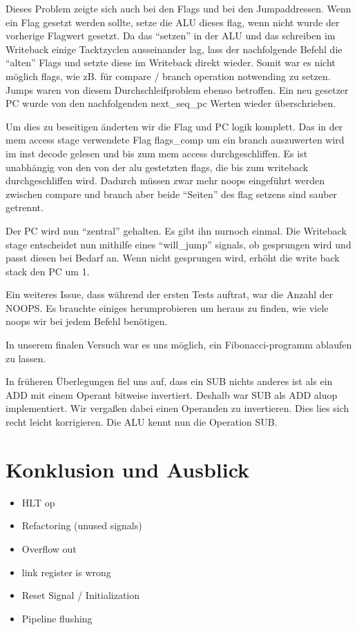 \documentclass[paper=a4,fontsize=12pt]{scrreprt}
\begin{document}
Dieses Problem zeigte sich auch bei den Flags und bei den Jumpaddressen.
Wenn ein Flag gesetzt werden sollte, setze die ALU dieses flag, wenn nicht wurde der vorherige Flagwert gesetzt.
Da das \enquote{setzen} in der ALU und das schreiben im Writeback einige Tacktzyclen ausseinander lag, lass der nachfolgende Befehl die \enquote{alten} Flags und setzte diese im Writeback direkt wieder.
Somit war es nicht möglich flags, wie zB. für compare / branch operation notwending zu setzen.
Jumps waren von diesem Durchschleifproblem ebenso betroffen. Ein neu gesetzer PC wurde von den nachfolgenden next\_seq\_pc Werten wieder überschrieben.

Um dies zu beseitigen änderten wir die Flag und PC logik komplett.
Das in der mem access stage verwendete Flag flags\_comp um ein branch auszuwerten wird im inst decode gelesen und bis zum mem access durchgeschliffen.
Es ist unabhängig von den von der alu gestetzten flags, die bis zum writeback durchgeschliffen wird.
Dadurch müssen zwar mehr noops eingeführt werden zwischen compare und branch aber beide \enquote{Seiten} des flag setzens sind sauber getrennt.

Der PC wird nun \enquote{zentral} gehalten.
Es gibt ihn nurnoch einmal.
Die Writeback stage entscheidet nun mithilfe eines \enquote{will\_jump} signals, ob gesprungen wird und passt diesen bei Bedarf an.
Wenn nicht gesprungen wird, erhöht die write back stack den PC um 1.

Ein weiteres Issue, dass während der ersten Tests auftrat, war die Anzahl der NOOPS.
Es brauchte einiges herumprobieren um heraus zu finden, wie viele noops wir bei jedem Befehl benötigen.

In unserem finalen Versuch war es uns möglich, ein Fibonacci-programm ablaufen zu lassen.

In früheren Überlegungen fiel uns auf, dass ein SUB nichts anderes ist als ein ADD mit einem Operant bitweise invertiert.
Deshalb war SUB als ADD aluop implementiert.
Wir vergaßen dabei einen Operanden zu invertieren.
Dies lies sich recht leicht korrigieren.
Die ALU kennt nun die Operation SUB.

\chapter{Konklusion und Ausblick}
\begin{itemize}
    \item HLT op
    \item Refactoring (unused signals)
    \item Overflow out
    \item link register is wrong
    \item Reset Signal / Initialization
    \item Pipeline flushing
\end{itemize}
\end{document}
